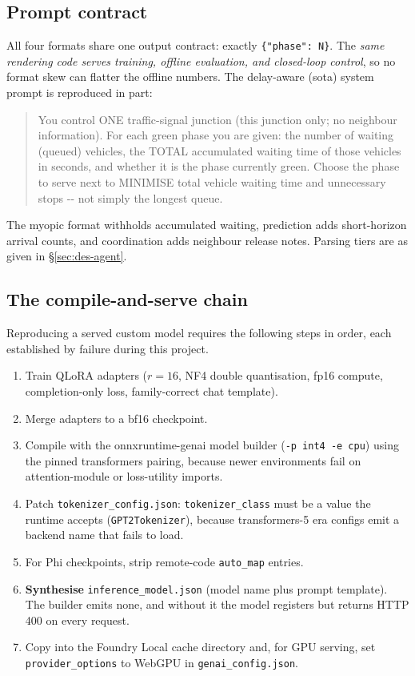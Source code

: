 \subsection{Prompt contract}
All four formats share one output contract: exactly
\texttt{\{"phase": N\}}. The \emph{same rendering code serves training,
offline evaluation, and closed-loop control}, so no format skew can
flatter the offline numbers. The delay-aware (sota) system prompt is
reproduced in part:

\begin{quote}\small\ttfamily\raggedright
You control ONE traffic-signal junction (this junction only; no neighbour
information). For each green phase you are given: the number of waiting
(queued) vehicles, the TOTAL accumulated waiting time of those vehicles in
seconds, and whether it is the phase currently green. Choose the phase to
serve next to MINIMISE total vehicle waiting time and unnecessary stops -{}-
not simply the longest queue.
\end{quote}

The myopic format withholds accumulated waiting, prediction adds
short-horizon arrival counts, and coordination adds neighbour release
notes. Parsing tiers are as given in \S\ref{sec:des-agent}.

\subsection{The compile-and-serve chain}
Reproducing a served custom model requires the following steps in order,
each established by failure during this project.

\begin{enumerate}
\item Train QLoRA adapters ($r{=}16$, NF4 double quantisation, fp16
compute, completion-only loss, family-correct chat template).
\item Merge adapters to a bf16 checkpoint.
\item Compile with the onnxruntime-genai model builder
(\texttt{-p int4 -e cpu}) using the pinned transformers pairing, because
newer environments fail on attention-module or loss-utility imports.
\item Patch \texttt{tokenizer\_config.json}: \texttt{tokenizer\_class}
must be a value the runtime accepts (\texttt{GPT2Tokenizer}), because
transformers-5 era configs emit a backend name that fails to load.
\item For Phi checkpoints, strip remote-code \texttt{auto\_map} entries.
\item \textbf{Synthesise} \texttt{inference\_model.json} (model name plus
prompt template). The builder emits none, and without it the model
registers but returns HTTP 400 on every request.
\item Copy into the Foundry Local cache directory and, for GPU serving,
set \texttt{provider\_options} to WebGPU in \texttt{genai\_config.json}.
\end{enumerate}


